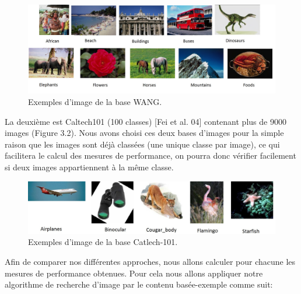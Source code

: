 \begin{figure}[H]
	\centering
		\includegraphics[width=7in]{Figures/wang.jpg}
	\caption[An Electron]{Exemples d'image de la base WANG.}
	\label{fig:Electron}
\end{figure}

	La deuxième est Caltech101 (100 classes) [Fei et al. 04] contenant plus de 9000 images (Figure 3.2). Nous avons choisi ces deux bases d'images pour la simple raison que les images sont déjà classées (une unique classe par image), ce qui facilitera le calcul des mesures de performance, on pourra donc vérifier facilement si deux images appartiennent à la même classe.
	


\begin{figure}[H]
	\centering
		\includegraphics[width=5.6in]{Figures/caltech101.jpg}
	\caption[An Electron]{Exemples d'image de la base Catlech-101.}
	\label{fig:Electron}
\end{figure}	
	
	
	Afin de comparer nos différentes approches, nous allons calculer pour chacune les mesures de performance obtenues. Pour cela nous allons appliquer notre algorithme de recherche d'image par le contenu basée-exemple comme suit:


